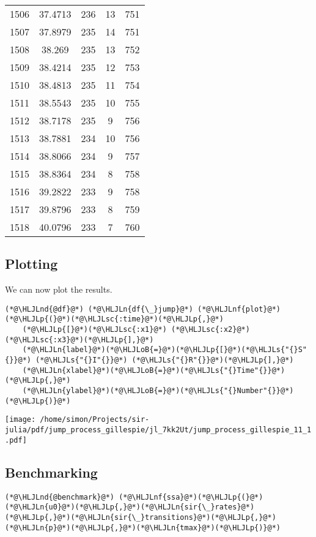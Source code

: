 \documentclass[12pt,a4paper]{article}
\newcommand{\HLJLn}[1]{#1}
\newcommand{\HLJLnd}[1]{\textcolor[RGB]{214,102,97}{#1}}
\newcommand{\HLJLnf}[1]{\textcolor[RGB]{66,102,213}{#1}}
\newcommand{\HLJLs}[1]{\textcolor[RGB]{201,61,57}{#1}}
\newcommand{\HLJLsc}[1]{\textcolor[RGB]{201,61,57}{#1}}
\newcommand{\HLJLoB}[1]{\textcolor[RGB]{102,102,102}{\textbf{#1}}}
\newcommand{\HLJLp}[1]{#1}
\begin{document}
\begin{tabular}{r|cccc}
	1506 & 37.4713 & 236 & 13 & 751 \\
	1507 & 37.8979 & 235 & 14 & 751 \\
	1508 & 38.269 & 235 & 13 & 752 \\
	1509 & 38.4214 & 235 & 12 & 753 \\
	1510 & 38.4813 & 235 & 11 & 754 \\
	1511 & 38.5543 & 235 & 10 & 755 \\
	1512 & 38.7178 & 235 & 9 & 756 \\
	1513 & 38.7881 & 234 & 10 & 756 \\
	1514 & 38.8066 & 234 & 9 & 757 \\
	1515 & 38.8364 & 234 & 8 & 758 \\
	1516 & 39.2822 & 233 & 9 & 758 \\
	1517 & 39.8796 & 233 & 8 & 759 \\
	1518 & 40.0796 & 233 & 7 & 760 \\
\end{tabular}


\subsection{Plotting}
We can now plot the results.


\begin{lstlisting}
(*@\HLJLnd{@df}@*) (*@\HLJLn{df{\_}jump}@*) (*@\HLJLnf{plot}@*)(*@\HLJLp{(}@*)(*@\HLJLsc{:time}@*)(*@\HLJLp{,}@*)
    (*@\HLJLp{[}@*)(*@\HLJLsc{:x1}@*) (*@\HLJLsc{:x2}@*) (*@\HLJLsc{:x3}@*)(*@\HLJLp{],}@*)
    (*@\HLJLn{label}@*)(*@\HLJLoB{=}@*)(*@\HLJLp{[}@*)(*@\HLJLs{"{}S"{}}@*) (*@\HLJLs{"{}I"{}}@*) (*@\HLJLs{"{}R"{}}@*)(*@\HLJLp{],}@*)
    (*@\HLJLn{xlabel}@*)(*@\HLJLoB{=}@*)(*@\HLJLs{"{}Time"{}}@*)(*@\HLJLp{,}@*)
    (*@\HLJLn{ylabel}@*)(*@\HLJLoB{=}@*)(*@\HLJLs{"{}Number"{}}@*)(*@\HLJLp{)}@*)
\end{lstlisting}

\texttt{[image: /home/simon/Projects/sir-julia/pdf/jump\_process\_gillespie/jl\_7kk2Ut/jump\_process\_gillespie\_11\_1.pdf]}

\subsection{Benchmarking}

\begin{lstlisting}
(*@\HLJLnd{@benchmark}@*) (*@\HLJLnf{ssa}@*)(*@\HLJLp{(}@*)(*@\HLJLn{u0}@*)(*@\HLJLp{,}@*)(*@\HLJLn{sir{\_}rates}@*)(*@\HLJLp{,}@*)(*@\HLJLn{sir{\_}transitions}@*)(*@\HLJLp{,}@*)(*@\HLJLn{p}@*)(*@\HLJLp{,}@*)(*@\HLJLn{tmax}@*)(*@\HLJLp{)}@*)
\end{lstlisting}
\end{document}
